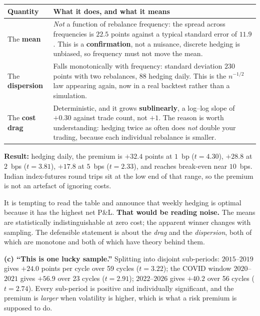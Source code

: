 \documentclass[11pt,a4paper]{article}
\begin{document}
\begin{table}[H]
\centering\small
\begin{tabular}{L{3.3cm}L{11.9cm}}
\toprule
\textbf{Quantity} & \textbf{What it does, and what it means} \\
\midrule
The \textbf{mean} & \emph{Not} a function of rebalance frequency: the spread across
frequencies is $22.5$ points against a typical standard error of $11.9$. This is a
\textbf{confirmation}, not a nuisance, discrete hedging is unbiased, so frequency must not
move the mean. \\
The \textbf{dispersion} & Falls monotonically with frequency: standard deviation $230$ points
with two rebalances, $88$ hedging daily. This is the $n^{-1/2}$ law appearing again, now in a
real backtest rather than a simulation. \\
The \textbf{cost drag} & Deterministic, and it grows \textbf{sublinearly}, a log--log slope
of $+0.30$ against trade count, not $+1$. The reason is worth understanding: hedging twice as
often does \emph{not} double your trading, because each individual rebalance is smaller. \\
\bottomrule
\end{tabular}
\end{table}

\textbf{Result:} hedging daily, the premium is $+32.4$ points at $1$~bp ($t=4.30$), $+28.8$ at
$2$~bps ($t=3.81$), $+17.8$ at $5$~bps ($t=2.33$), and reaches break-even near $10$~bps. Indian
index-futures round trips sit at the low end of that range, so the premium is not an artefact
of ignoring costs.

\begin{trapbox}
It is tempting to read the table and announce that weekly hedging is optimal because it has the
highest net P\&L. \textbf{That would be reading noise.} The means are statistically
indistinguishable at zero cost; the apparent winner changes with sampling. The defensible
statement is about the \emph{drag} and the \emph{dispersion}, both of which are monotone and
both of which have theory behind them.
\end{trapbox}

\textbf{(c) ``This is one lucky sample.''}
Splitting into disjoint sub-periods: $2015$--$2019$ gives $+24.0$ points per cycle over 59
cycles ($t=3.22$); the COVID window $2020$--$2021$ gives $+56.9$ over 23 cycles ($t=2.91$);
$2022$--$2026$ gives $+40.2$ over 56 cycles ($t=2.74$). Every sub-period is positive and
individually significant, and the premium is \emph{larger} when volatility is higher, which
is what a risk premium is supposed to do.
\end{document}
